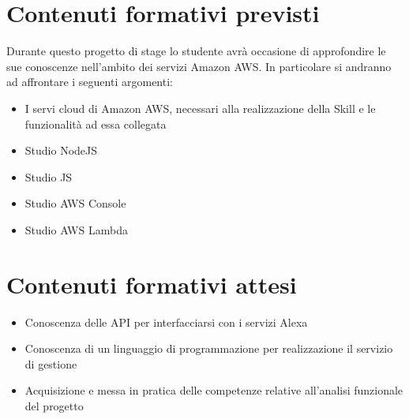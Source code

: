 \section*{Contenuti formativi previsti}
Durante questo progetto di stage lo studente avrà occasione di approfondire le sue conoscenze nell'ambito dei servizi Amazon AWS.
In particolare si andranno ad affrontare i seguenti argomenti:
\begin{itemize}
	\item I servi cloud di Amazon AWS, necessari alla realizzazione della Skill e le funzionalità ad essa collegata
	\item Studio NodeJS
	\item Studio JS
	\item Studio AWS Console
	\item Studio AWS Lambda
\end{itemize}
\section*{Contenuti formativi attesi}
\begin{itemize}
	\item Conoscenza delle API per interfacciarsi con i servizi Alexa
	\item Conoscenza di un linguaggio di programmazione per realizzazione il servizio di gestione
 	\item Acquisizione e messa in pratica delle competenze relative all'analisi funzionale del progetto
\end{itemize}
\newpage